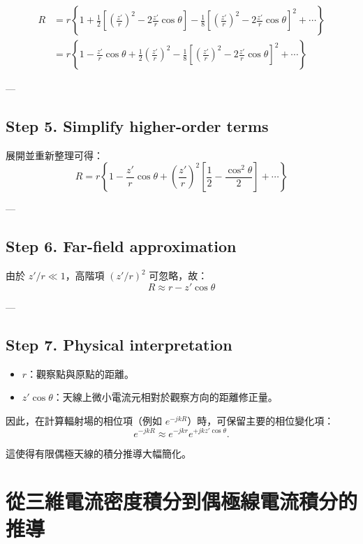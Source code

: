 \documentclass{article}
\begin{document}
\[
\begin{aligned}
R &= r\left\{1 + \frac{1}{2}\left[\left(\frac{z'}{r}\right)^2 - 2\frac{z'}{r}\cos\theta\right]
- \frac{1}{8}\left[\left(\frac{z'}{r}\right)^2 - 2\frac{z'}{r}\cos\theta\right]^2 + \cdots \right\} \\
&= r\left\{1 - \frac{z'}{r}\cos\theta + \frac{1}{2}\left(\frac{z'}{r}\right)^2
- \frac{1}{8}\left[\left(\frac{z'}{r}\right)^2 - 2\frac{z'}{r}\cos\theta\right]^2 + \cdots \right\}
\end{aligned}
\]

---

\subsection*{Step 5. Simplify higher-order terms}

展開並重新整理可得：
\[
R = r\left\{1 - \frac{z'}{r}\cos\theta
+ \left(\frac{z'}{r}\right)^2\left[\frac{1}{2} - \frac{\cos^2\theta}{2}\right] + \cdots \right\}
\]

---

\subsection*{Step 6. Far-field approximation}

由於 $z'/r \ll 1$，高階項 $(z'/r)^2$ 可忽略，故：
\[
\boxed{R \approx r - z'\cos\theta}
\]

---

\subsection*{Step 7. Physical interpretation}

\begin{itemize}
    \item $r$：觀察點與原點的距離。
    \item $z'\cos\theta$：天線上微小電流元相對於觀察方向的距離修正量。
\end{itemize}

因此，在計算輻射場的相位項（例如 $e^{-jkR}$）時，可保留主要的相位變化項：
\[
e^{-jkR} \approx e^{-jkr} e^{+jkz'\cos\theta}.
\]

這使得有限偶極天線的積分推導大幅簡化。


\section*{從三維電流密度積分到偶極線電流積分的推導}
\end{document}
